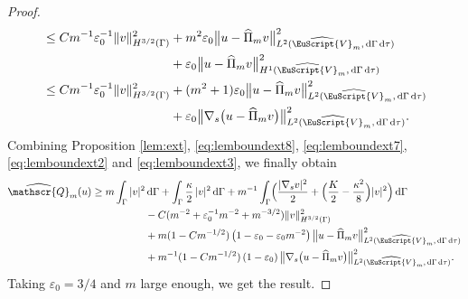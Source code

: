 \documentclass[JEP,XML,SOM,Unicode]{cedram}
\let\mathcal \EuScript
\newcommand{\scrQ}{\mathscr{Q}}
\newcommand{\cV}{\mathcal{V}}
\theoremstyle{plain}
\theoremstyle{definition}
\newcommand{\dx}{\mathrm{\,d}}
\begin{document}
\begin{proof}
\begin{equation}
\begin{split}
&\leq Cm^{-1}\varepsilon_0^{-1}\|v\|_{H^{3/2}(\Gamma)} ^2
+ m^{2}\varepsilon_0\bigl\|u - \widehat{\Pi}_mv\bigr\|^2_{L^2(\widehat{\cV}_m, \dx\Gamma\dx\tau)}\\
&\hspace*{3.55cm}+\varepsilon_0\bigl\|u - \widehat{\Pi}_mv\bigr\|^2_{H^1(\widehat{\cV}_m, \dx\Gamma\dx\tau)}
\\
&\leq Cm^{-1}\varepsilon_0^{-1}\|v\|_{H^{3/2}(\Gamma)} ^2
+ (m^{2}+1)\varepsilon_0\bigl\|u - \widehat{\Pi}_mv\bigr\|^2_{L^2(\widehat{\cV}_m, \dx\Gamma\dx\tau)}\\
&\hspace*{3.55cm}+\varepsilon_0\bigl\|\nabla_s\bigl(u - \widehat{\Pi}_mv\bigr)\bigr\|^2_{L^2(\widehat{\cV}_m, \dx\Gamma\dx\tau)}.
\end{split}\end{equation}
Combining Proposition \ref{lem:ext}, \eqref{eq:lemboundext8}, \eqref{eq:lemboundext7}, \eqref{eq:lemboundext2} and \eqref{eq:lemboundext3}, we finally obtain
\[\begin{split}
\widehat{\scrQ}_m(u)\geq
m\int_\Gamma
|v|^2
&\dx\Gamma
+
\int_\Gamma
\frac{\kappa}{2}\,|v|^2
\dx\Gamma
+
m^{-1}\int_\Gamma \Bigl(
\frac{|\nabla_s v|^2}{2}
+
\Bigl(\frac{K}{2}-\frac{\kappa^2}{8}\Bigr)|v|^2
\Bigr)\dx\Gamma
\\&
-C(m^{-2}+\varepsilon_0^{-1}m^{-2}+m^{-3/2}) \|v\|_{H^{3/2}(\Gamma)} ^2
\\&
+m(1-Cm^{-1/2})\left(1-\varepsilon_0-\varepsilon_0 m^{-2}\right)
\bigl\|u-\widehat{\Pi}_mv\bigr\|^2_{L^2(\widehat{\cV}_m, \dx\Gamma\dx\tau)}
\\
&
+m^{-1}(1-Cm^{-1/2})\left(1-\varepsilon_0\right)
\bigl\|\nabla_s \bigl(u - \widehat{\Pi}_mv\bigr)\bigr\|^2_{L^2(\widehat{\cV}_m, \dx\Gamma\dx\tau)}.
\end{split}\]
Taking $\varepsilon_0 = 3/4$ and $m$ large enough, we get the result.
\end{proof}
\end{document}
